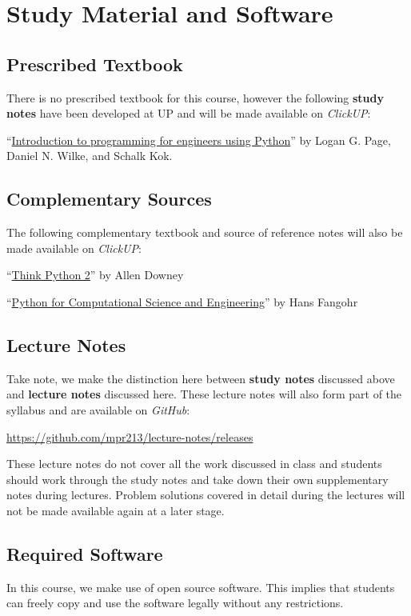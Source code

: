 \section{Study Material and Software}
    \subsection{Prescribed Textbook}
        There is no prescribed textbook for this course, however the following
        \textbf{study notes} have been developed at UP and will be made
        available on {\it ClickUP}:

        ``\underline{Introduction to programming for engineers using Python}''
        by Logan G. Page, Daniel N. Wilke, and Schalk Kok.

    \subsection{Complementary Sources}
        The following complementary textbook and source of reference notes will
        also be made available on {\it ClickUP}:

        ``\underline{Think Python 2}'' by Allen Downey

        ``\underline{Python for Computational Science and Engineering}'' by
        Hans Fangohr

    \subsection{Lecture Notes}
        Take note, we make the distinction here between \textbf{study notes}
        discussed above and \textbf{lecture notes} discussed here. These
        lecture notes will also form part of the syllabus and are available on
        \textit{GitHub}:

        \url{https://github.com/mpr213/lecture-notes/releases}

        These lecture notes do not cover all the work discussed in class and
        students should work through the study notes and take down their own
        supplementary notes during lectures. Problem solutions covered in
        detail during the lectures will not be made available again at a later
        stage.

    \subsection{Required Software}
        In this course, we make use of open source software. This implies that
        students can freely copy and use the software legally without any
        restrictions.

